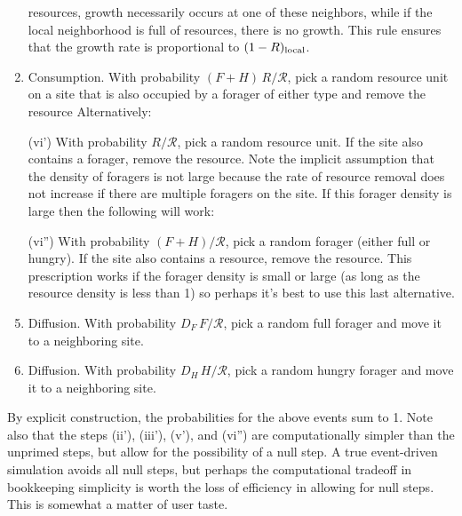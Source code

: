 \documentclass[11pt]{iopart}
\begin{document}
\begin{enumerate}
  resources, growth necessarily occurs at one of these neighbors, while if
  the local neighborhood is full of resources, there is no growth.  This rule
  ensures that the growth rate is proportional to $(1-R)_{\rm local}$.
\item Consumption.  With probability $(F+H)\,R/\mathcal{R}$, pick a random
  resource unit on a site that is also occupied by a forager of either type
  and remove the resource  Alternatively:
\item[(vi')] With probability $R/\mathcal{R}$, pick a random resource unit.
  If the site also contains a forager, remove the resource.  Note the
  implicit assumption that the density of foragers is not large because the
  rate of resource removal does not increase if there are multiple foragers
  on the site.  If this forager density is large then the following will
  work:
\item[(vi'')] With probability $(F+H)/\mathcal{R}$, pick a random forager
  (either full or hungry).  If the site also contains a resource, remove the
  resource.  This prescription works if the forager density is small or large
  (as long as the resource density is less than 1) so perhaps it's best to
  use this last alternative.
\item Diffusion.  With probability $D_F\, F/\mathcal{R}$, pick a random full
  forager and move it to a neighboring site.
\item Diffusion.  With probability $D_H\, H/\mathcal{R}$, pick a random
  hungry forager and move it to a neighboring site.
\end{enumerate}
By explicit construction, the probabilities for the above events sum to 1.
Note also that the steps (ii'), (iii'), (v'), and (vi'') are computationally
simpler than the unprimed steps, but allow for the possibility of a null
step.  A true event-driven simulation avoids all null steps, but perhaps the
computational tradeoff in bookkeeping simplicity is worth the loss of
efficiency in allowing for null steps.  This is somewhat a matter of user
taste.
\end{document}
